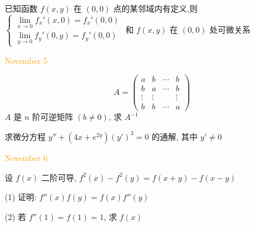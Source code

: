 \begin{solution}
	
\end{solution}

\begin{example}[][Exam: 37.1.8]
	已知函数 $f(x,y)$ 在 $(0,0)$ 点的某邻域内有定义,则 
$\begin{cases}
	\lim\limits_{x\to 0}f_{x}'(x,0)  =  f_{x}'(0,0)\\
	\lim\limits_{y\to 0}f_{y}'(0,y)  =  f_{y}'(0,0)
\end{cases}$ 和 $f(x,y)$ 在 $(0,0)$ 处可微关系
\end{example}

\begin{solution}
	
\end{solution}


\textcolor{orange}{November 5}

\begin{example}[][Exam: 37.1.9]
$$A=\begin{pmatrix}
	   a   &    b   & \cdots &    b   \\
	   b   &    a   & \cdots &    b   \\
	\vdots & \vdots &        & \vdots \\
	   b   &    b   & \cdots &    a
\end{pmatrix}$$
 $A$ 是 $n$ 阶可逆矩阵 $(b\neq 0)$, 求 $A^{-1}$
\end{example}

 
\begin{solution}
	
\end{solution}

\begin{example}[][Exam: 37.1.10]
	求微分方程 $y''+(4x+e^{2y})(y')^3=0$ 的通解, 其中 $y'\neq 0$
\end{example}


\begin{solution}
	
\end{solution}


\textcolor{orange}{November 6}

\begin{example}[][Exam: 37.1.11]
	设 $f(x)$ 二阶可导, $f^{2}(x)-f^{2}(y)=f(x+y)-f(x-y)$

(1) 证明: $f''(x)f(y)=f(x)f''(y)$

(2) 若 $f''(1)=f(1)=1$, 求 $f(x)$

\end{example}

